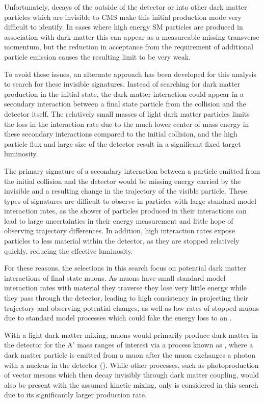 Unfortunately, decays of the \aprime outside of the detector or into other dark matter particles which are invisible to CMS make this initial production mode very difficult to identify.
In cases where high energy SM particles are produced in association with dark matter this can appear as a measureable missing transverse momentum, but the reduction in acceptance from the requirement of additional particle emission causes the resulting limit to be very weak.

To avoid these issues, an alternate approach has been developed for this analysis to search for these invisible signatures.
Instead of searching for dark matter production in the initial state, the dark matter interaction could appear in a secondary interaction between a final state particle from the collision and the detector itself.
The relatively small masses of light dark matter particles limits the loss in the interaction rate due to the much lower center of mass energy in these secondary interactions compared to the initial collision, and the high particle flux and large size of the detector result in a significant fixed target luminosity.

The primary signature of a secondary interaction between a particle emitted from the initial collision and the detector would be missing energy carried by the invisible \aprime and a resulting change in the trajectory of the visible particle.
These types of signatures are difficult to observe in particles with large standard model interaction rates, as the shower of particles produced in their interactions can lead to large uncertainties in their energy measurement and little hope of observing trajectory differences.
In addition, high interaction rates expose particles to less material within the detector, as they are stopped relatively quickly, reducing the effective luminosity.

For these reasons, the selections in this search focus on potential dark matter interactions of final state muons.
As muons have small standard model interaction rates with material they traverse they lose very little energy while they pass through the detector, leading to high consistency in projecting their trajectory and observing potential changes, as well as low rates of stopped muons due to standard model processes which could fake the energy loss to an \aprime.

With a light dark matter mixing, muons would primarily produce dark matter in the detector for the A' mass ranges of interest via a process known as \dbrem, where a dark matter particle is emitted from a muon after the muon exchanges a photon with a nucleus in the detector ().
While other processes, such as photoproduction of vector mesons which then decay invisibly through dark matter coupling, would also be present with the assumed kinetic mixing, only \dbrem is considered in this search due to its significantly larger production rate.

